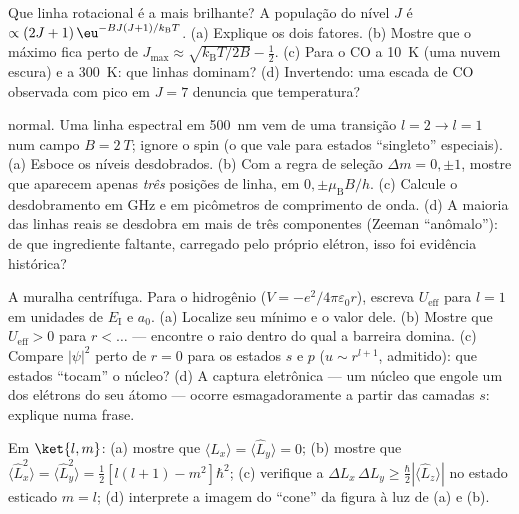 \begin{exercise}[$\star\star$]\label{exo:b3:quantum-angular-momentum:6}
Que linha rotacional é a mais brilhante? A população do nível $J$ é
$\propto (2J+1)\,\eu^{-BJ(J+1)/k_{\text{B}}T}$. (a) Explique os dois
fatores. (b) Mostre que o máximo fica perto de $J_{\max} \approx
\sqrt{k_{\text{B}}T/2B} - \tfrac12$. (c) Para o CO a \qty{10}{K}
(uma nuvem escura) e a \qty{300}{K}: que linhas dominam? (d)
Invertendo: uma escada de CO observada com pico em $J = 7$ denuncia
que temperatura?
\end{exercise}

\begin{exercise}[$\star\star$]\label{exo:b3:quantum-angular-momentum:7}
 normal. Uma linha espectral em \qty{500}{nm} vem de uma
transição $l = 2 \to l = 1$ num campo $B = \qty{2}{T}$; ignore o
spin (o que vale para estados ``singleto'' especiais). (a) Esboce os
níveis desdobrados. (b) Com a regra de seleção $\Delta m = 0, \pm1$,
mostre que aparecem apenas \emph{três} posições de linha, em
$0, \pm\mu_{\text{B}}B/h$. (c) Calcule o desdobramento em GHz e em
picômetros de comprimento de onda. (d) A maioria das linhas reais se
desdobra em mais de três componentes (Zeeman ``anômalo''): de que
ingrediente faltante, carregado pelo próprio elétron, isso foi
evidência histórica?
\end{exercise}

\begin{exercise}[$\star\star$]\label{exo:b3:quantum-angular-momentum:8}
A muralha centrífuga. Para o hidrogênio ($V = -e^2/4\pi\varepsilon_0r$),
escreva $U_{\text{eff}}$ para $l = 1$ em unidades de $E_{\text{I}}$ e
$a_0$. (a) Localize seu mínimo e o valor dele. (b) Mostre que $U_{\text{eff}} >
0$ para $r < \dots$ --- encontre o raio dentro do qual a barreira
domina. (c) Compare $|\psi|^2$ perto de $r = 0$ para os estados $s$ e
$p$ ($u \sim r^{l+1}$, admitido): que estados ``tocam'' o núcleo? (d) A
captura eletrônica --- um núcleo que engole um dos elétrons do seu
átomo --- ocorre esmagadoramente a partir das camadas $s$: explique
numa frase.
\end{exercise}

\begin{exercise}[$\star\star$]\label{exo:b3:quantum-angular-momentum:9}
Em $\ket{l, m}$: (a) mostre que $\langle\hat L_x\rangle = \langle\hat
L_y\rangle = 0$; (b) mostre que $\langle\hat L_x^2\rangle = \langle\hat
L_y^2\rangle = \tfrac12[l(l+1) - m^2]\hbar^2$; (c) verifique a
 $\Delta L_x\,\Delta L_y \ge \tfrac\hbar2
|\langle\hat L_z\rangle|$ no estado esticado $m = l$; (d) interprete a
imagem do ``cone'' da figura à luz de (a) e (b).
\end{exercise}

